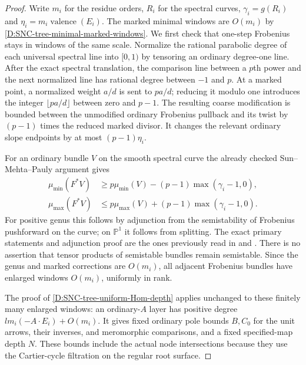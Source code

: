 \begin{proof}
Write $m_i$ for the residue orders, $R_i$ for the
spectral curves, $\gamma_i=g(R_i)$ and
$\eta_i=m_i\operatorname{valence}(E_i)$.
The marked minimal windows are $O(m_i)$ by
\ref{D:SNC-tree-minimal-marked-windows}. We first
check that one-step Frobenius stays in windows
of the same scale. Normalize the rational
parabolic degree of each universal spectral
line into $[0,1)$ by tensoring an ordinary
degree-one line. After the exact spectral
translation, the comparison line between a
$p$th power and the next normalized line
has rational degree between $-1$ and $p$.
At a marked point, a normalized weight $a/d$
is sent to $pa/d$; reducing it modulo one
introduces the integer $\lfloor pa/d\rfloor$
between zero and $p-1$. The resulting coarse
modification is bounded between the unmodified
ordinary Frobenius pullback and its twist by
$(p-1)$ times the reduced marked divisor.
It changes the relevant ordinary slope
endpoints by at most $(p-1)\eta_i$.

For an ordinary bundle $V$ on the smooth
spectral curve the already checked
Sun--Mehta--Pauly argument gives
\[
 \begin{split}
 \mu_{\min}(F^*V)&\geq p\mu_{\min}(V)
                  -(p-1)\max(\gamma_i-1,0),\\
 \mu_{\max}(F^*V)&\leq p\mu_{\max}(V)
                  +(p-1)\max(\gamma_i-1,0).
 \end{split}                                           \tag{D.TC.1}
\]
For positive genus this follows by adjunction
from the semistability of Frobenius pushforward
on the curve; on $\mathbb P^1$ it follows from
splitting. The exact primary statements and
adjunction proof are the ones previously read
in \citet[Theorem2.2]{C_Sun2008} and
\citet[Proposition1.3]{C_MehtaPauly2007}.
There is no assertion that tensor products
of semistable bundles remain semistable.
Since the genus and marked corrections are
$O(m_i)$, all adjacent Frobenius bundles have
enlarged windows $O(m_i)$, uniformly in rank.

The proof of
\ref{D:SNC-tree-uniform-Hom-depth} applies
unchanged to these finitely many enlarged
windows: an ordinary-$A$ layer has positive
degree $l m_i(-A\cdot E_i)+O(m_i)$.
It gives fixed ordinary pole bounds $B,C_0$
for the unit arrows, their inverses, and
meromorphic comparisons, and a fixed
specified-map depth $N$. These bounds
include the actual node intersections
because they use the Cartier-cycle
filtration on the regular root surface.


\end{proof}
